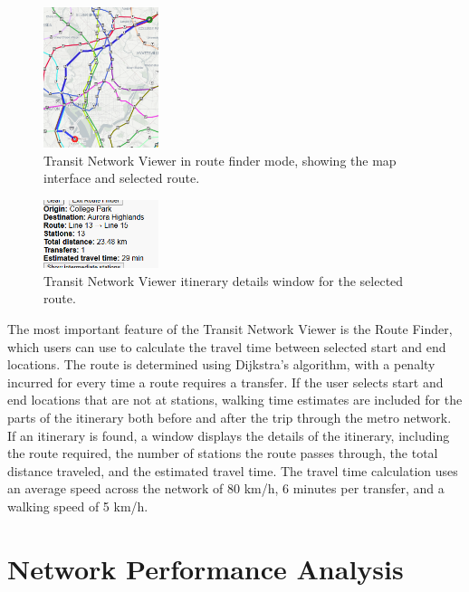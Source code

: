 \documentclass[sigconf,nonacm]{acmart}
\begin{document}
\begin{figure}[h]
    \centering
    \includegraphics[width=0.3\textwidth]{./img/itin_1_gen.png}
    \caption{Transit Network Viewer in route finder mode, showing the map interface and selected route.}
    \label{fig:viewer_map}
\end{figure}

\begin{figure}[h]
    \centering
    \includegraphics[width=0.3\textwidth]{./img/itin_1_gen_details.png}
    \caption{Transit Network Viewer itinerary details window for the selected route.}
    \label{fig:viewer_details}
\end{figure}

The most important feature of the Transit Network Viewer is the Route Finder, which users can use to calculate the travel time between selected start and end locations. The route is determined using Dijkstra's algorithm, with a penalty incurred for every time a route requires a transfer. If the user selects start and end locations that are not at stations, walking time estimates are included for the parts of the itinerary both before and after the trip through the metro network. If an itinerary is found, a window displays the details of the itinerary, including the route required, the number of stations the route passes through, the total distance traveled, and the estimated travel time. The travel time calculation uses an average speed across the network of 80 km/h, 6 minutes per transfer, and a walking speed of 5 km/h. 

\section{Network Performance Analysis}
\end{document}
